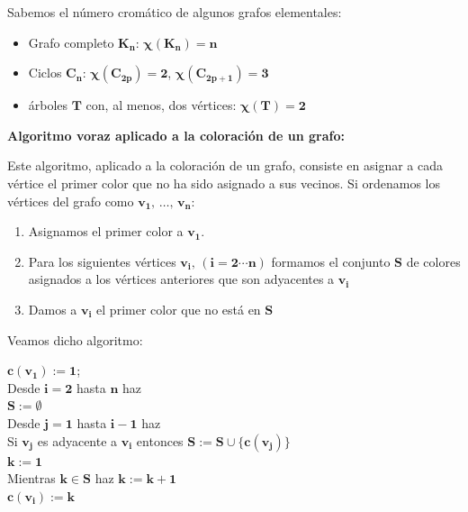 \documentclass[twoside]{report}
\newcommand{\bs}[1]{\boldsymbol{#1}}
\begin{document}
\vspace{0.4cm}
\noindent Sabemos el número cromático de algunos grafos elementales:

\begin{itemize}
\item Grafo completo $\bs{K_n}$: $\bs{\chi(K_n)=n}$

\item Ciclos $\bs{C_n}$: $\bs{\chi(C_{2p})=2}$, $\bs{\chi(C_{2p+1})=3}$

\item árboles $\bs{T}$ con, al menos, dos vértices: $\bs{\chi(T)=2}$
\end{itemize}
\vspace{0.5cm}

\noindent\textbf{Algoritmo voraz aplicado a la coloración de un grafo:}
\vspace{0.2cm}

Este algoritmo, aplicado a la coloración de un grafo, consiste en asignar a cada vértice el primer color que no ha sido asignado a sus
vecinos. Si ordenamos los vértices del grafo como $\bs{v_1,\,\ldots,\,v_n}$:
\vspace{0.2cm}

        \begin{enumerate}
            \item Asignamos el primer color a $\bs{v_1}$.
            \item Para los siguientes vértices $\bs{v_i,\,(i=2\cdots n)}$ formamos el conjunto $\bs{S}$ de colores asignados a los vértices anteriores que son adyacentes a $\bs{v_i}$
            \item Damos a $\bs{v_i}$ el primer color que no está en $\bs{S}$
        \end{enumerate}

\vspace{0.2cm}
Veamos dicho algoritmo:
\vspace{0.2cm}

        \noindent $\bs{c(v_1):=1}$;\\[1ex]
        \textsf{Desde} $\bs{i=2}$ \textsf{hasta} $\bs{n}$ \textsf{haz}\\[1ex]
        \hspace*{5ex} $\bs{S:=\emptyset}$\\
        \hspace*{5ex} \textsf{Desde} $\bs{j=1}$ \textsf{hasta} $\bs{i-1}$ \textsf{haz}\\[1ex]
        \hspace*{10ex} \textsf{Si} $\bs{v_j}$ es adyacente a $\bs{v_i}$ \textsf{entonces} $\bs{S:=S\cup\{c(v_j)\}}$\\[1ex]
        \hspace*{5ex} $\bs{k:=1}$\\[1ex]
        \hspace*{5ex} \textsf{Mientras} $\bs{k\in S}$ \textsf{haz} $\bs{k:=k+1}$\\[1ex]
        \hspace*{5ex} $\bs{c(v_i):=k}$
\end{document}
